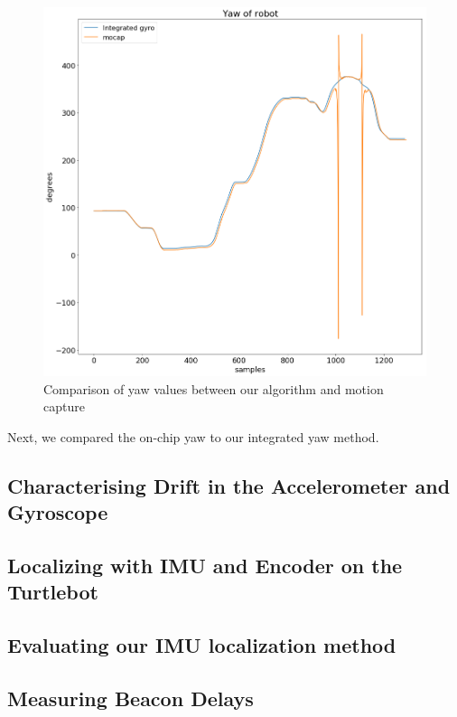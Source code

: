 \documentclass{article}
\begin{document}
    \begin{figure}[H]
      \centering
      \includegraphics[width=0.75\linewidth]{./images/yaw_mocap_versus_integration.png}
      \caption{Comparison of yaw values between our algorithm and motion capture}
      \label{fig:yaw_comparison}
    \end{figure}

    Next, we compared the on-chip yaw to our integrated yaw method. %


  \subsection{Characterising Drift in the Accelerometer and Gyroscope}

  \subsection{Localizing with IMU and Encoder on the Turtlebot}

    
  \subsection{Evaluating our IMU localization method}
  
  \subsection{Measuring Beacon Delays}
\end{document}
